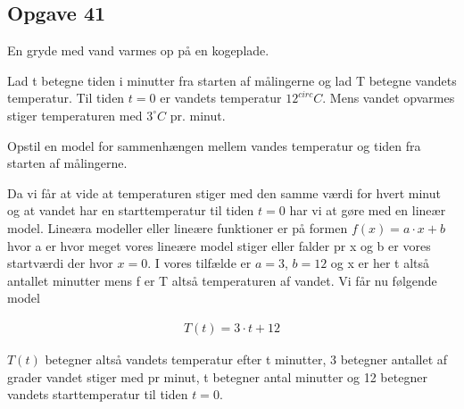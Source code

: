 \subsection{Opgave 41}

En gryde med vand varmes op på en kogeplade.

Lad t betegne tiden i minutter fra starten af målingerne og lad T betegne vandets temperatur. Til tiden 
$t=0$ er vandets temperatur $12^{circ}C$. Mens vandet opvarmes stiger temperaturen med $3^{\circ}C$ pr. minut.

Opstil en model for sammenhængen mellem vandes temperatur og tiden fra starten af målingerne.

\ans

Da vi får at vide at temperaturen stiger med den samme værdi for hvert minut og at vandet har en starttemperatur til tiden $t = 0$ 
har vi at gøre med en lineær model. Lineæra modeller eller lineære funktioner er på formen $f(x) = a\cdot x + b$ hvor a er hvor meget vores lineære model stiger eller falder pr x og 
b er vores startværdi der hvor $x = 0$. I vores tilfælde er $a = 3$, $b = 12$ og x er her t altså antallet minutter mens f er T altså temperaturen af vandet.
Vi får nu følgende model

\begin{align*}
    T(t) = 3\cdot t + 12
\end{align*}

$T(t)$ betegner altså vandets temperatur efter t minutter, 3 betegner antallet af grader vandet stiger med pr minut, t betegner antal minutter og 12 betegner 
vandets starttemperatur til tiden $t = 0$.



